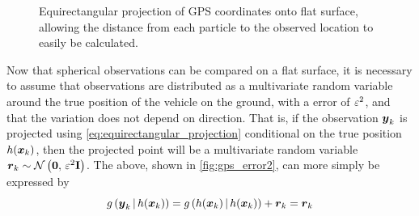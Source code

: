 \begin{knitrout}\small
{}\color{fgcolor}\begin{figure}

{\centering {}

}

\caption[Equirectangular projection of GPS coordinates onto flat surface, allowing the distance from each particle to the observed location to easily be calculated]{Equirectangular projection of GPS coordinates onto flat surface, allowing the distance from each particle to the observed location to easily be calculated.}\label{fig:gps_projection}
\end{figure}


\end{knitrout}


Now that spherical observations can be compared on a flat surface,
it is necessary to assume that \GPS{} observations are distributed
as a multivariate random variable around the true position of the vehicle
on the ground,
with a \GPS{} error of $\varepsilon^2$,
and that the variation does not depend on direction.
That is, if the observation $\boldsymbol{y}_k$ is projected using
\cref{eq:equirectangular_projection} conditional on the true position
$h(\boldsymbol x_k)$,
then the projected point will be a multivariate random variable
$\boldsymbol{r}_k \sim \mathcal{N}\left(\boldsymbol{0},\, \varepsilon^2 \mathbf{I}\right)$.
The above, shown in \cref{fig:gps_error2},
can more simply be expressed by
\begin{equation}
\label{eq:gps_error_model}
g\left(\boldsymbol{y}_k\,|\,h(\boldsymbol x_k)\right) =
    g\left(h(\boldsymbol x_k)\,|\,h(\boldsymbol x_k)\right) + \boldsymbol{r}_k
    = \boldsymbol{r}_k
\end{equation}

